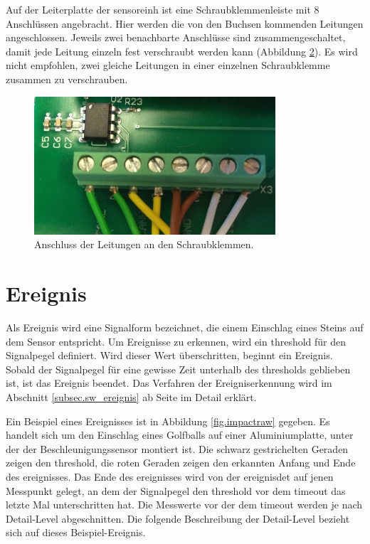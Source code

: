 \begin{figure}
\begin{minipage}{0.5\textwidth}
	\label{fig.polstecker}
\end{minipage}
\end{figure}

Auf der Leiterplatte der \gls{sensoreinh} ist eine Schraubklemmenleiste mit 8 Anschlüssen angebracht. Hier werden die von den Buchsen kommenden Leitungen angeschlossen. Jeweils zwei benachbarte Anschlüsse sind zusammengeschaltet, damit jede Leitung einzeln fest verschraubt werden kann (Abbildung \ref{fig.kabel}). Es wird nicht empfohlen, zwei gleiche Leitungen in einer einzelnen Schraubklemme zusammen zu verschrauben.

\begin{figure}
	\centering
		\includegraphics[width=0.8\textwidth]{images/AnschlussKabel.png}
	\caption{Anschluss der Leitungen an den Schraubklemmen.}
	\label{fig.kabel}
\end{figure}









\section{Ereignis}\label{sec.manualimpact}
Als Ereignis wird eine Signalform bezeichnet, die einem Einschlag eines Steins auf dem Sensor entspricht. Um Ereignisse zu erkennen, wird ein \gls{threshold} für den Signalpegel definiert. Wird dieser Wert überschritten, beginnt ein Ereignis. Sobald der Signalpegel für eine gewisse Zeit unterhalb des \gls{threshold}s geblieben ist, ist das Ereignis beendet. Das Verfahren der Ereigniserkennung wird im Abschnitt \ref{subsec.sw_ereignis} ab Seite \pageref{subsec.sw_ereignis} im Detail erklärt.

Ein Beispiel eines Ereignisses ist in Abbildung \ref{fig.impactraw} gegeben. Es handelt sich um den Einschlag eines Golfballs auf einer Aluminiumplatte, unter der der Beschleunigungssensor montiert ist. Die schwarz gestrichelten Geraden zeigen den \gls{threshold}, die roten Geraden zeigen den erkannten Anfang und Ende des \gls{ereignis}ses. Das Ende des \gls{ereignis}ses wird von der \gls{ereignisdet} auf jenen Messpunkt gelegt, an dem der Signalpegel den \gls{threshold} vor dem \gls{timeout} das letzte Mal unterschritten hat. Die Messwerte vor der dem \gls{timeout} werden je nach Detail-Level abgeschnitten. Die folgende Beschreibung der Detail-Level bezieht sich auf dieses Beispiel-Ereignis.

